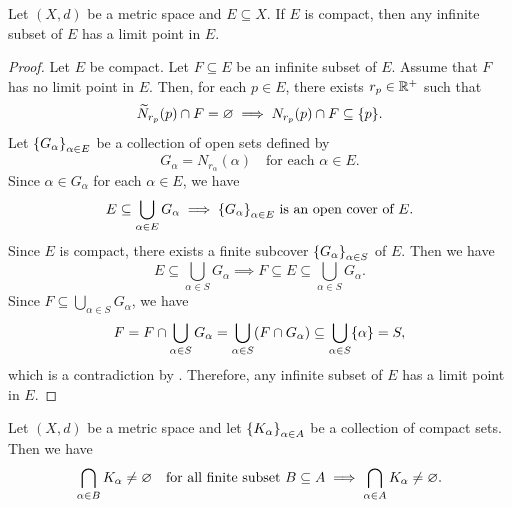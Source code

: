 \bigskip

\begin{theorem} \label{thm:InfiniteSubsetOfCompactSetHasLimitPoint}
    Let $(X, d)$ be a metric space and $E \subseteq X$. If $E$ is compact,
    then any infinite subset of $E$ has a limit point in $E$.
\end{theorem}

\begin{proof}
    Let $E$ be compact. Let $F \subseteq E$ be an infinite subset of $E$. Assume that $F$ has
    no limit point in $E$. Then, for each $p \in E$, there exists $r_{p} \in \R^{+}$ such that
    \[
    \widetilde{N}_{r_{p}}(p) \cap F = \vnot \implies N_{r_{p}}(p) \cap F \subseteq \set*{p}.
    \]
    Let $\set*{G_{\alpha}}_{\alpha \in E}$ be a collection of open sets defined by
    \[
    G_{\alpha} = N_{r_{\alpha}}(\alpha) \quad \text{for each } \alpha \in E.
    \]
    Since $\alpha \in G_{\alpha}$ for each $\alpha \in E$, we have
    \[
    E \subseteq \bigcup_{\alpha \in E} G_{\alpha} \implies \set*{G_{\alpha}}_{\alpha \in E} \text{ is an open cover of } E.
    \]
    Since $E$ is compact, there exists a finite subcover $\set*{G_{\alpha}}_{\alpha \in S}$ of $E$. Then we have
    \[
    E \subseteq \bigcup_{\alpha \in S} G_{\alpha} \implies F \subseteq E \subseteq \bigcup_{\alpha \in S} G_{\alpha}.
    \]
    Since $F \subseteq \displaystyle \bigcup_{\alpha \in S} G_{\alpha}$, we have
    \[
    F = F \cap \bigcup_{\alpha \in S} G_{\alpha} = \bigcup_{\alpha \in S} \paren*{F \cap G_{\alpha}}
    \subseteq \bigcup_{\alpha \in S} \set*{\alpha} = S,
    \]
    which is a contradiction by .
    Therefore, any infinite subset of $E$ has a limit point in $E$.
\end{proof}

\bigskip

\begin{theorem} \label{thm:FiniteCompactIntersectionProperty}
    Let $(X, d)$ be a metric space and let $\set*{K_{\alpha}}_{\alpha \in A}$ be a collection of compact sets. Then we have
    \[
    \bigcap_{\alpha \in B} K_{\alpha} \neq \vnot \quad \text{for all finite subset }
    B \subseteq A \implies \bigcap_{\alpha \in A} K_{\alpha} \neq \vnot.
    \]
\end{theorem}


